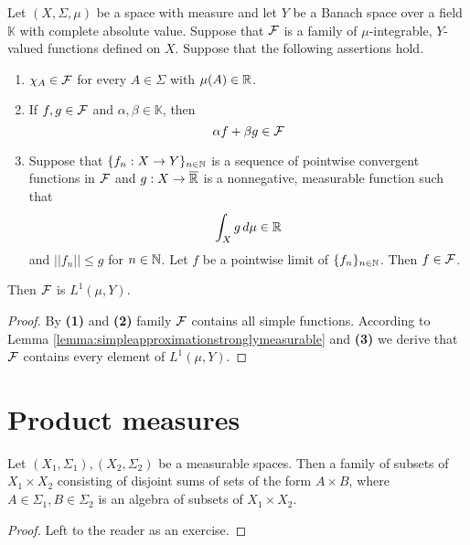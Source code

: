 \begin{corollary}\label{corollary:measurableinductionforbanachvalued}
Let $(X,\Sigma,\mu)$ be a space with measure and let $Y$ be a Banach space over a field $\mathbb{K}$ with complete absolute value. Suppose that ${\mathcal F}$ is a family of $\mu$-integrable, $Y$-valued functions defined on $X$. Suppose that the following assertions hold.
\begin{enumerate}[label=\emph{\textbf{(\arabic*)}}, leftmargin=*]
\item $\chi_A\in {\mathcal F}$ for every $A\in \Sigma$ with $\mu(A)\in {\mathbb R}$.
\item If $f, g\in {\mathcal F}$ and $\alpha, \beta\in \mathbb{K}$, then
$$\alpha f + \beta g\in {\mathcal F}$$
\item Suppose that $\{f_n:X\rightarrow Y\}_{n\in {\mathbb N}}$ is a sequence of pointwise convergent functions in ${\mathcal F}$ and $g:X\rightarrow \overline{{\mathbb R}}$ is a nonnegative, measurable function such that
$$\int_Xg\,d\mu \in {\mathbb R}$$
and $||f_n||\leq g$ for $n\in {\mathbb N}$. Let $f$ be a pointwise limit of $\{f_n\}_{n\in {\mathbb N}}$. Then $f\in {\mathcal F}$.
\end{enumerate}
Then ${\mathcal F}$ is $L^1(\mu,Y)$.
\end{corollary}
\begin{proof}
By \textbf{(1)} and \textbf{(2)} family ${\mathcal F}$ contains all simple functions. According to Lemma \ref{lemma:simpleapproximationstronglymeasurable} and \textbf{(3)} we derive that ${\mathcal F}$ contains every element of $L^1(\mu,Y)$.
\end{proof}

\section{Product measures}

\begin{fact}\label{fact:productalgebra}
Let $(X_1,\Sigma_1), (X_2,\Sigma_2)$ be a measurable spaces. Then a family of subsets of $X_1\times X_2$ consisting of disjoint sums of sets of the form $A\times B$, where $A\in \Sigma_1, B\in \Sigma_2$ is an algebra of subsets of $X_1\times X_2$.
\end{fact}
\begin{proof}
Left to the reader as an exercise.
\end{proof}

